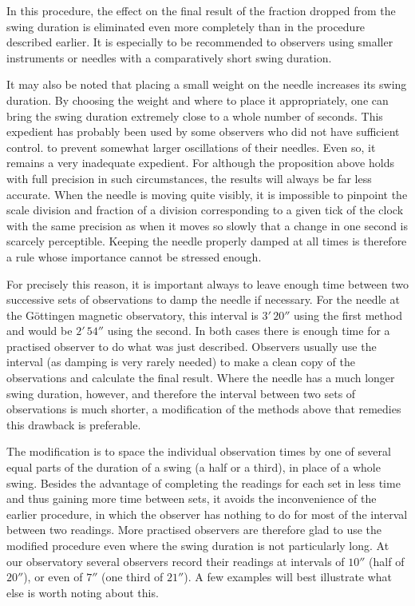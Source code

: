 In this procedure, the effect on the final result of the fraction dropped from the swing duration is eliminated even more completely than in the procedure described earlier. It is especially to be recommended to observers using smaller instruments or needles with a comparatively short swing duration.

It may also be noted that placing a small weight on the needle increases its swing duration. By choosing the weight and where to place it appropriately, one can bring the swing duration extremely close to a whole number of seconds. This expedient has probably been used by some observers who did not have sufficient control. to prevent somewhat larger oscillations of their needles. Even so, it remains a very inadequate expedient. For although the proposition above holds with full precision in such circumstances, the results will always be far less accurate. When the needle is moving quite visibly, it is impossible to pinpoint the scale division and fraction of a division corresponding to a given tick of the clock with the same precision as when it moves so slowly that a change in one second is scarcely perceptible. Keeping the needle properly damped at all times is therefore a rule whose importance cannot be stressed enough.

For precisely this reason, it is important always to leave enough time between two successive sets of observations to damp the needle if necessary. For the needle at the Göttingen magnetic observatory, this interval is $3'\,20''$ using the first method and would be $2'\,54''$ using the second. In both cases there is enough time for a practised observer to do what was just described. Observers usually use the interval (as
damping is very rarely needed) to make a clean copy of the observations and calculate the final result. Where the needle has a much longer swing duration, however, and therefore the interval between two sets of observations is much shorter, a modification of the methods above that remedies this drawback is preferable.

The modification is to space the individual observation times by one of several equal parts of the duration of a swing (a half or a third), in place of a whole swing. Besides the advantage of completing the readings for each set in less time and thus gaining more time between sets, it avoids the inconvenience of the earlier procedure, in which the observer has nothing to do for most of the interval between two readings. More practised observers are therefore glad to use the modified procedure even where the swing duration is not particularly long. At our observatory several observers record their readings at intervals of $10''$ (half of $20''$), or even of $7''$ (one third of $21''$). A few examples will best illustrate what else is worth noting about this.


